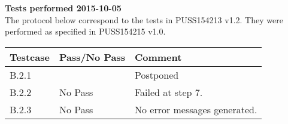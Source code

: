 \renewcommand{\testdate}{2015-10-05}
\textbf{Tests performed \testdate} \\
The protocol below correspond to the tests in PUSS154213 v1.2. They were performed as specified in PUSS154215 v1.0.
\begin{center}
  		\begin{tabular}{| p{3cm} | p{5cm} | p{5cm} |}
    		\hline
	    	\textbf{Testcase}			& \textbf{Pass/No Pass} 	& \textbf{Comment} \\ \hline
    		B.2.1		 						& 									& Postponed 				\\ \hline
    		B.2.2		 						& No Pass 										& Failed at step 7.				 \\	\hline
    		B.2.3		 						& No Pass 										& No error messages generated.				 \\	\hline
 		\end{tabular}
\end{center}